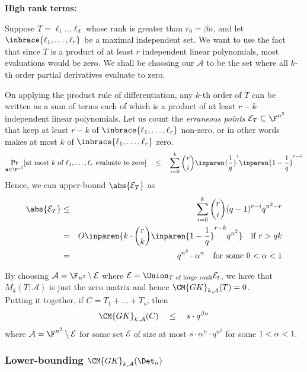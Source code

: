 \noindent
{\bf High rank terms:}

Suppose $T = \ell_1\dots \ell_d$ whose rank is greater than $r_0 =
\beta n$, and let $\inbrace{\ell_1, \dots, \ell_r}$ be a maximal
independent set. We want to use the fact that since $T$ is a product
of at least $r$ independent linear polynomials, most evaluations would
be zero. We shall be choosing our $\mathcal{A}$ to be the set where
all $k$-th order partial derivatives evaluate to zero. 

On applying the product rule of differentiation, any $k$-th order of
$T$ can be written as a sum of terms each of which is a product of at
least $r-k$ independent linear polynomials. Let us count the
\emph{erraneous points} $\mathcal{E}_T\subseteq \F^{n^2}$ that keep at
least $r-k$ of $\inbrace{\ell_1,\dots, \ell_r}$ non-zero, or in other
words makes at most $k$ of $\inbrace{\ell_1,\dots, \ell_r}$ zero.
$$
\Pr_{\mathbf{a}\in \F^{n^2}}[\text{at most $k$ of $\ell_1,\dots,
  \ell_r$ evaluate to zero}] \quad\leq \quad \sum_{i=0}^k \binom{r}{i} \inparen{\frac{1}{q}}^i\inparen{1 - \frac{1}{q}}^{r-i}
$$
Hence, we can upper-bound $\abs{\mathcal{E}_T}$ as
\begin{eqnarray*}
\abs{\mathcal{E}_T} &\leq & \sum_{i=0}^k \binom{r}{i} (q-1)^{r-i}q^{n^2 - r}\\
 & = & O\inparen{k\cdot \binom{r}{k}\inparen{1 - \frac{1}{q}}^{r-k} q^{n^2}} \quad\text{if $r > qk$}\\
 & = & q^{n^2} \cdot \alpha^n\quad\text{for some $0< \alpha < 1$}
 \end{eqnarray*}

 By choosing $\mathcal{A} = \F_{n^2} \setminus \mathcal{E}$ where
 $\mathcal{E} = \Union_{\text{$T$ of large rank}} \mathcal{E}_t$, we
 have that $M_k(T;\mathcal{A})$ is just the zero matrix and hence
 $\CM{GK}_{k,\mathcal{A}}(T) = 0$.\\


Putting it together, if $C = T_1 + \dots + T_s$, then 
\begin{equation}\label{eqn:gk-upper-bound-circuit}
\CM{GK}_{k,\mathcal{A}}(C) \quad \leq \quad s \cdot
q^{\beta n}
\end{equation} 
where $\mathcal{A} = \F^{n^2} \setminus \mathcal{E}$ for some set
$\mathcal{E}$ of size at most $s \cdot \alpha^n \cdot q^{n^2}$ for
some $1< \alpha < 1$.

\subsubsection{Lower-bounding $\CM{GK}_{k,\mathcal{A}}(\Det_n)$}

